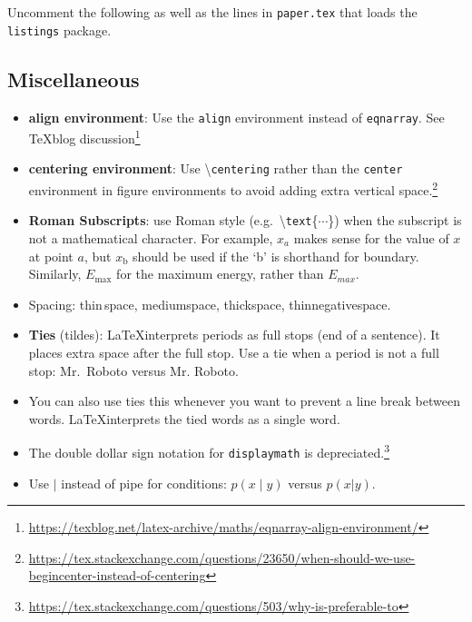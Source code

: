 Uncomment the following as well as the lines in \texttt{paper.tex} that loads the \texttt{listings} package.
% 



\subsection{Miscellaneous}

\begin{itemize}
	\item \textbf{align environment}: Use the \texttt{align} environment instead of \texttt{eqnarray}. See TeXblog discussion\footnote{\url{https://texblog.net/latex-archive/maths/eqnarray-align-environment/}}
	\item \textbf{centering environment}: Use \textbackslash\texttt{centering} rather than the \texttt{center} environment in figure environments to avoid adding extra vertical space.\footnote{\url{https://tex.stackexchange.com/questions/23650/when-should-we-use-begincenter-instead-of-centering}}
	\item \textbf{Roman Subscripts}: use Roman style (e.g.~\textbackslash \texttt{text}\{$\cdots$\}) when the subscript is not a mathematical character. For example, $x_a$ makes sense for the value of $x$ at point $a$, but $x_\text{b}$ should be used if the `b' is shorthand for boundary. Similarly, $E_\text{max}$ for the maximum energy, rather than $E_{max}$.
	\item Spacing: thin\,space, medium\:space, thick\;space, thin\!negative\!space.
	\item \textbf{Ties} (tildes): \LaTeX interprets periods as full stops (end of a sentence). It places extra space after the full stop. Use a tie when a period is not a full stop: Mr.~Roboto versus Mr. Roboto. 
	\item You can also use ties this whenever you want to prevent a line break between words. \LaTeX interprets the tied words as a single word.
	\item The double dollar sign notation for \texttt{displaymath} is depreciated.\footnote{\url{https://tex.stackexchange.com/questions/503/why-is-preferable-to}}
	\item Use $\mid$ instead of pipe for conditions: $p(x\mid y)$ versus $p(x|y)$.
\end{itemize}

